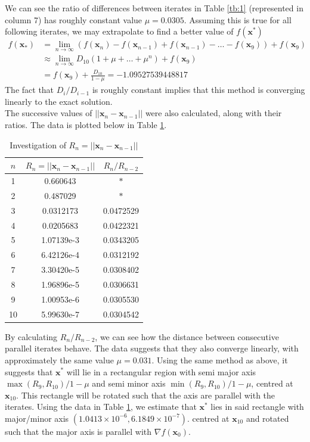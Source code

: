 \documentclass[10pt,a4paper,notitlepage]{article}
\newcommand{\abs}[1]{\lvert#1\rvert}
\newcommand{\x}{\mathbf{x}}
\begin{document}
We can see the ratio of differences between iterates in Table \ref{tb:1} (represented in column 7) has roughly constant value $\mu =0.0305$. Assuming this is true for all following iterates, we may extrapolate to find a better value of $f(\x^{*})$
\begin{equation}
\begin{aligned}
f(\mathbf{x}_{*})&= \lim_{n\rightarrow \infty} \left( f(\mathbf{x}_{n})-f(\mathbf{x}_{n-1})+f(\mathbf{x}_{n-1})-\hdots -f(\mathbf{x}_{9})\right) +f(\mathbf{x}_{9})\\
&\approx \lim_{n\rightarrow \infty} D_{10}\left(1 + \mu + \hdots + \mu^{n}\right)+f(\mathbf{x}_{9})\\
&=f(\mathbf{x}_{9})+\frac{D_{10}}{1-\mu}=-1.09527539448817
\end{aligned}
\end{equation}
The fact that $D_{i}/D_{i-1}$ is roughly constant implies that this method is converging linearly to the exact solution.\\

The successive values of $\abs{\abs{\x_{n}-\x_{n-1}}}$ were also calculated, along with their ratios. The data is plotted below in Table \ref{tb:9}.
\begin{table}[H]
\centering
\begin{tabular}{|ccc|} \hline $n$ & $R_{n}=\abs{\abs{\x_{n}-\x_{n-1}}}$ & $R_{n}/R_{n-2}$\\
\hline 1 & 0.660643 & $\ast$\\ 
2 & 0.487029 & $\ast$ \\ 
3 & 0.0312173 & 0.0472529\\ 
4 & 0.0205683 & 0.0422321\\ 
5 & 1.07139e-3 & 0.0343205\\ 
6 & 6.42126e-4 & 0.0312192\\ 
7 & 3.30420e-5 & 0.0308402\\ 
8 & 1.96896e-5 & 0.0306631\\ 
9 & 1.00953e-6 & 0.0305530\\ 
10 & 5.99630e-7 & 0.0304542\\ \hline 
\end{tabular}
\caption{Investigation of $R_{n}=\abs{\abs{\x_{n}-\x_{n-1}}}$}\label{tb:9}
\end{table}
By calculating $R_{n}/R_{n-2}$, we can see how the distance between consecutive parallel iterates behave. The data suggests that they also converge linearly, with approximately the same value $\mu=0.031$. Using the same method as above, it suggests that $\x^{*}$ will lie in a rectangular region with semi major axis $\max\left(R_{9},R_{10}\right)/1-\mu$ and semi minor axis $\min\left(R_{9},R_{10}\right)/1-\mu$, centred at $\x_{10}$.  This rectangle will be rotated such that the axis are parallel with the iterates. Using the data in Table \ref{tb:9}, we estimate that $\x^{*}$ lies in said rectangle with major/minor axis $(1.0413\times 10^{-6},6.1849\times 10^{-7})$. centred at $\x_{10}$ and rotated such that the major axis is parallel with $\nabla f(\x_{0})$.\\
\end{document}
